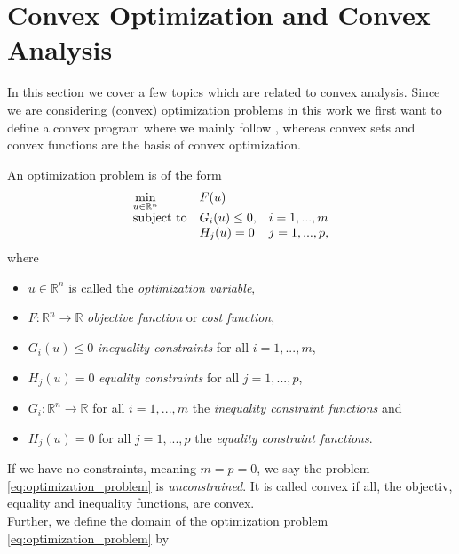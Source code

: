 \section{Convex Optimization and Convex Analysis} %
\label{sec:convex_optimization_and_convex_analysis}

    In this section we cover a few topics which are related to convex analysis. Since we are considering (convex) optimization problems in this work we first want to define a convex program where we mainly follow \cite{Boyd}, whereas convex sets and convex functions are the basis of convex optimization.

    An optimization problem is of the form
        \begin{equation}
            \begin{array}{l l l}
                \min\limits_{u \in \mathbb{R}^{n}} & F(u) & \\
                \textnormal{subject to} & G_{i}(u) \le 0, & i = 1, ..., m \\
                & H_{j}(u) = 0 & j = 1, ..., p,
            \end{array}
            \label{eq:optimization_problem}
        \end{equation}
    where
        \begin{itemize}
            \item $u \in \mathbb{R}^{n}$ is called the \textit{optimization variable},
            \item $F: \mathbb{R}^{n} \longrightarrow \mathbb{R}$ \textit{objective function} or \textit{cost function},
            \item $G_{i}(u) \le 0$ \textit{inequality constraints} for all $i = 1, ..., m$,
            \item $H_{j}(u) = 0$ \textit{equality constraints} for all $j = 1, ..., p$,
            \item $G_{i}: \mathbb{R}^{n} \longrightarrow \mathbb{R}$ for all $i = 1, ..., m$ the \textit{inequality constraint functions} and
            \item $H_{j}(u) = 0$ for all $j = 1, ..., p$ the \textit{equality constraint functions}.
        \end{itemize}
    If we have no constraints, meaning $m = p = 0$, we say the problem \ref{eq:optimization_problem} is \textit{unconstrained}. It is called convex if all, the objectiv, equality and inequality functions, are convex.\\
    Further, we define the domain of the optimization problem \ref{eq:optimization_problem} by
